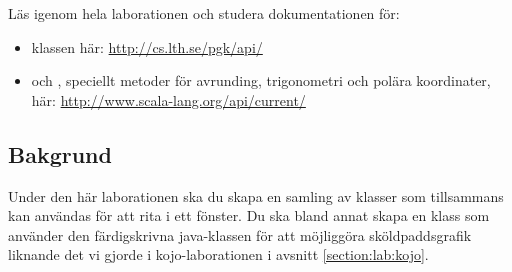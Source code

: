 

\Lab{\LabWeekFIVE}

\begin{Goals}

\end{Goals}

\begin{Preparations}
\item {}

\item Läs igenom hela laborationen och studera dokumentationen för:
\begin{itemize}[nolistsep,noitemsep]
\item klassen  här: \url{http://cs.lth.se/pgk/api/}

\item {} och , speciellt metoder för avrunding, trigonometri och polära koordinater, här:
\url{http://www.scala-lang.org/api/current/}
\end{itemize}

\end{Preparations}

\subsection{Bakgrund}

Under den här laborationen ska du skapa en samling av klasser som tillsammans kan användas för att rita i ett fönster. Du ska bland annat skapa en klass  som använder den färdigskrivna java-klassen  för att möjliggöra sköldpaddsgrafik liknande det vi gjorde i kojo-laborationen i avsnitt \ref{section:lab:kojo}.


